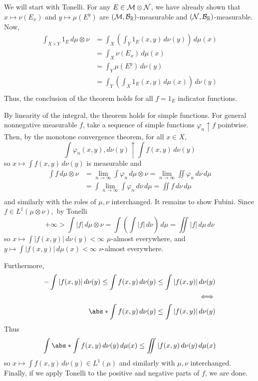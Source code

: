 \documentclass[x11names,reqno,14pt]{extarticle}
\newcommand*{\oo}{\infty}
\begin{document}
\proof

We will start with Tonelli. For any $E \in \mathcal{M}\otimes\mathcal{N}$, we have already shown that $x\mapsto \nu(E_x)$ and $y\mapsto\mu(E^y)$ are $(\mathcal{M},\mathcal{B}_{\mathbb{R}})$-measurable and $(\mathcal{N}, \mathcal{B}_{\mathbb{R}})$-measurable. Now, 
\begin{align*}
\int_{X\times Y}1_E\,d\mu\otimes\nu & = \int_X\left(\int_Y1_E(x, y)\,d\nu(y)\right)\,d\mu(x) \\
& = \int_X\nu(E_x)\,d\mu(x) \\
& = \int_Y\mu(E^y)\,d\nu(y) \\
& = \int_Y\left(\int_X1_E(x, y)\,d\mu(x)\right)\,d\nu(y) \\
\end{align*}
Thus, the conclusion of the theorem holds for all $f = 1_E$ indicator functions. 

By linearity of the integral, the theorem holds for simple functions. For general nonnegative measurable $f$, take a sequence of simple functions $\varphi_n\uparrow f$ pointwise. Then, by the monotone convergence theorem, for all $x \in X$, 
\[
\int\varphi_n(x, y),d\nu(y) \uparrow\int f(x, y)\,d\nu(y)
\]
so $x\mapsto \int f(x, y)\,d\nu(y)$ is measurable and 
\begin{align*}
\int f\,d\mu\otimes\nu & = \lim_{n\to\oo}\int\varphi_n\,d\mu\otimes\nu = \lim_{n\to\oo}\iint\varphi_n\,d\nu\,d\mu \\
& = \int\lim_{n\to\oo}\int\varphi_n\,d\nu\,d\mu = \iint f\,d\nu\,d\mu \\
\end{align*}
and similarly with the roles of $\mu, \nu$ interchanged. It remains to show Fubini. Since $f \in L^1(\mu\otimes\nu),$ by Tonelli
\[
+\oo > \int|f|\,d\mu\otimes\nu = \int\left(\int|f|\,d\nu\right)\,d\mu = \iint|f|\,d\mu\,d\nu 
\]
so $x\mapsto \int|f(x, y)|\,d\nu(y)< \oo$ $\mu$-almost everywhere, and $y\mapsto\int|f(x, y)|\,d\mu(x)< \oo$ $\nu$-almost everywhere. 

Furthermore, 
\begin{align*}
-\int|f(x, y)|\,d\nu(y) \leq \int f(x, y)\,d\nu(y) \leq \int|f(x, y)|\,d\nu(y) \\
\iff \\
\abs*{\int f(x, y)\,d\nu(y)} \leq \int|f(x, y)|\,d\nu(y) \\
\end{align*} 
Thus
\[
\int\abs*{\int f(x, y)\,d\nu(y)}\,d\mu(x) \leq \iint|f(x, y)\,d\nu(y)\,d\mu(x) 
\]
so $x\mapsto \int f(x, y)\,d\nu(y) \in L^1(\mu)$ and similarly with $\mu, \nu$ interchanged. Finally, if we apply Tonelli to the positive and negative parts of $f$, we are done. 
\end{document}
